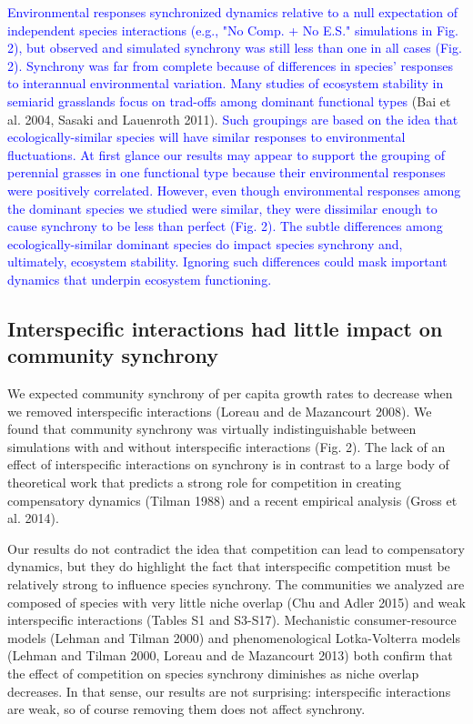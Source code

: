 \documentclass[12pt,]{article}
\begin{document}
\textcolor{blue}{Environmental responses synchronized dynamics relative to a null expectation of independent species interactions (e.g., "No Comp. + No E.S." simulations in Fig. 2), but observed and simulated synchrony was still less than one in all cases (Fig. 2).
Synchrony was far from complete because of differences in species' responses to interannual environmental variation.
Many studies of ecosystem stability in semiarid grasslands focus on trad-offs among dominant functional types}
(Bai et al. 2004, Sasaki and Lauenroth 2011).
\textcolor{blue}{Such groupings are based on the idea that ecologically-similar species will have similar responses to environmental fluctuations.
At first glance our results may appear to support the grouping of perennial grasses in one functional type because their environmental responses were positively correlated.
However, even though environmental responses among the dominant species we studied were similar, they were dissimilar enough to cause synchrony to be less than perfect (Fig. 2).
The subtle differences among ecologically-similar dominant species do impact species synchrony and, ultimately, ecosystem stability.
Ignoring such differences could mask important dynamics that underpin ecosystem functioning.}

\subsection{Interspecific interactions had little impact on community synchrony}

We expected community synchrony of per capita growth rates to decrease
when we removed interspecific interactions (Loreau and {{de Mazancourt}}
2008). We found that community synchrony was virtually indistinguishable
between simulations with and without interspecific interactions (Fig.
2). The lack of an effect of interspecific interactions on synchrony is
in contrast to a large body of theoretical work that predicts a strong
role for competition in creating compensatory dynamics (Tilman 1988) and
a recent empirical analysis (Gross et al. 2014).

Our results do not contradict the idea that competition can lead to
compensatory dynamics, but they do highlight the fact that interspecific
competition must be relatively strong to influence species synchrony.
The communities we analyzed are composed of species with very little
niche overlap (Chu and Adler 2015) and weak interspecific interactions
(Tables S1 and S3-S17). Mechanistic consumer-resource models (Lehman and
Tilman 2000) and phenomenological Lotka-Volterra models (Lehman and
Tilman 2000, Loreau and {{de Mazancourt}} 2013) both confirm that the
effect of competition on species synchrony diminishes as niche overlap
decreases. In that sense, our results are not surprising: interspecific
interactions are weak, so of course removing them does not affect
synchrony.
\end{document}
